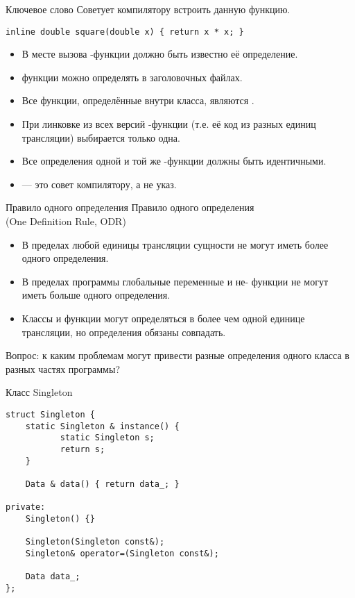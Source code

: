\documentclass{beamer}
\begin{document}
\begin{frame}[fragile]{Ключевое слово }
    Советует компилятору встроить данную функцию.
\begin{lstlisting}
inline double square(double x) { return x * x; }
\end{lstlisting}
\begin{itemize}
    \item В месте вызова -функции должно 
        быть известно её определение.

    \item {} функции можно определять 
        в заголовочных файлах.

    \item Все функции, определённые внутри класса, являются
        .

    \item При линковке из всех версий -функции
        (т.е. её код из разных единиц трансляции)
        выбирается только одна.

    \item Все определения одной и той же -функции
        должны быть идентичными.

    \item {} — это совет компилятору, а не указ.
\end{itemize}
\end{frame}

\begin{frame}[fragile]{Правило одного определения}
Правило одного определения\\ (One Definition Rule, ODR)
\begin{itemize}
    \item В пределах любой единицы трансляции сущности не могут иметь более одного определения. 
    \item В пределах программы глобальные переменные и не- функции не могут иметь больше
        одного определения.
    \item Классы и  функции могут определяться в более чем одной единице
        трансляции, но определения обязаны совпадать.
\end{itemize}
Вопрос: к каким проблемам могут привести разные
определения одного класса в разных частях программы?
\end{frame}

\begin{frame}[fragile]{Класс Singleton}
\begin{lstlisting}
struct Singleton {
    static Singleton & instance() {
           static Singleton s;
           return s;
    }

    Data & data() { return data_; }

private:
    Singleton() {}
    
    Singleton(Singleton const&);
    Singleton& operator=(Singleton const&);
    
    Data data_;
};
\end{lstlisting}
\end{frame}
\end{document}
